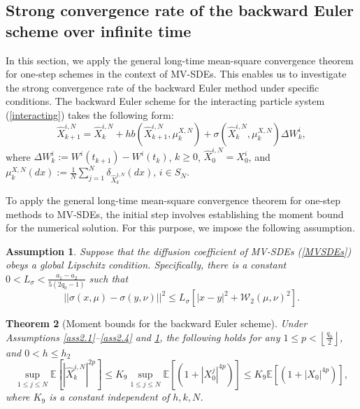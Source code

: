 \documentclass[12pt]{article}
\numberwithin{equation}{section}
\newtheorem{assumption}{Assumption}[section]
\newtheorem{theorem}[assumption]{Theorem}   %
\begin{document}
\subsection{Strong convergence rate of the backward Euler scheme  over infinite time }\label{strong convergence rate of the backward Euler scheme  over infinite time}
In this section, we apply the general long-time mean-square convergence theorem for one-step schemes in the context of MV-SDEs. This enables us to investigate the strong convergence rate of the backward Euler method under specific conditions. The backward Euler scheme for the interacting particle system (\ref{interacting}) takes the following form:
\begin{equation}\tag{3.25}\label{6.1}
\hat{X}_{k+1}^{i,N}=\hat{X}_{k}^{i,N}+hb\left( \hat{X}_{k+1}^{i,N},\mu _{k}^{X,N} \right) +\sigma \left( \hat{X}_{k}^{i,N},\mu _{k}^{X,N} \right) \Delta W_{k}^{i},
\end{equation}
where $ \Delta W_{k}^i:=W^i\left(t_{k+1}\right)-W^i\left(t_{k}\right)$, $k\geq0$, $\hat{X}_0^{i, N}={X}_{0}^{i}$, and $ \mu_k^{X, N}\left(dx\right):=\tfrac{1}{N} \sum_{j=1}^N \delta_{\hat{X}_{k}^{j,N}}\left(d x\right)$, $i\in S_{N}$.

To apply the general  long-time mean-square convergence theorem  for one-step methods   to MV-SDEs, the initial step involves establishing the moment  bound  for the numerical solution. For this purpose, we impose the following assumption. 

\begin{assumption}\label{ass6.1}
Suppose that the diffusion coefficient of MV-SDEs (\ref{MVSDEs}) obeys a global Lipschitz condition. Specifically, there is a constant $0<L_{\sigma}<\tfrac{a_1-a_2}{5\left( 2q_0-1 \right)}$ such that
\begin{equation}\tag{3.26}\label{6.2}
\left|\left|\sigma \left( x,\mu \right) -\sigma \left( y,\nu \right) \right|\right|^2\leq L_{\sigma}\left[ \left|x-y\right|^2+\mathcal{W}_2\left( \mu ,\nu \right) ^2 \right].
\end{equation}
\end{assumption}

\begin{theorem}[Moment bounds for the backward Euler scheme]\label{momentboundsforBEM}
Under Assumptions \ref{ass2.1}--\ref{ass2.4} and \ref{ass6.1}, the following holds for any $1 \leq p < \left\lfloor \frac{q_0}{2} \right\rfloor$, and $0<h \leq h_2$  \begin{equation}\tag{3.27}\label{6.5}
\underset{1\leqslant j\leqslant N}{\sup}\mathbb{E}\left[\left|\hat{X}^{j,N}_k\right|^{2 p}\right] \leq K_9 \underset{1\leqslant j\leqslant N}{\sup}\mathbb{E}\left[\left(1+\left|X_0^{j}\right|^{4 p}\right)\right]\le  K_9\mathbb{E}\left[\left(1+\left|X_0\right|^{4 p}\right)\right],
\end{equation}
where $K_9$ is a constant independent of $h, k, N$.
\end{theorem}
\end{document}
